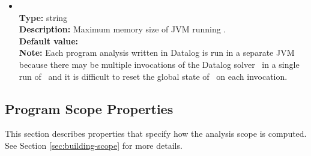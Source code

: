 \begin{itemize}
\item
{} \\
{\bf Type:} string \\
{\bf Description:} Maximum memory size of JVM running \bddbddb. \\
{\bf Default value:}  \\
{\bf Note:} Each program analysis written in Datalog is run in a separate JVM because there may be multiple invocations of the Datalog solver \bddbddb\ in a single run of \Chord\ and it is difficult to reset the global state of \bddbddb\ on each invocation.
\end{itemize}

\subsection{Program Scope Properties}

This section describes properties that specify how the analysis scope is computed.
See Section \ref{sec:building-scope} for more details.

